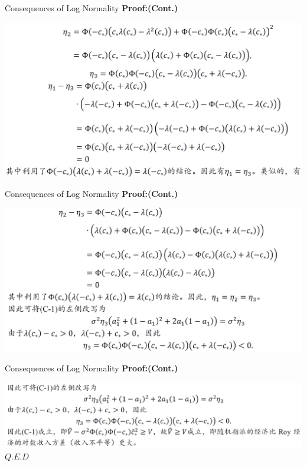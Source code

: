 \documentclass{beamer}
\begin{document}
\begin{frame}{Consequences of Log Normality}
	\textbf{Proof:(Cont.)}
	
	\includegraphics[scale=0.29]{theorem2_3}
\end{frame}
\begin{frame}{Consequences of Log Normality}
	\textbf{Proof:(Cont.)}
	
	\includegraphics[scale=0.29]{theorem2_4}
\end{frame}
\begin{frame}{Consequences of Log Normality}
	\textbf{Proof:(Cont.)}
	
	\includegraphics[scale=0.5]{theorem2_5}
	\hfill $Q.E.D$
\end{frame}
\end{document}
